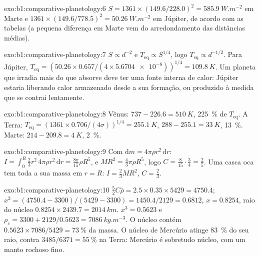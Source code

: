 \begin{solution}{exo:b1:comparative-planetology:6}
$S = 1361\times(149.6/228.0)^2 = \qty{585.9}{W.m^{-2}}$ em Marte e
$1361\times(149.6/778.5)^2 = \qty{50.26}{W.m^{-2}}$ em Júpiter, de acordo
com as tabelas (a pequena diferença em Marte vem do arredondamento das
distâncias médias).
\end{solution}

\begin{solution}{exo:b1:comparative-planetology:7}
$S \propto d^{-2}$ e $T_\mathrm{eq} \propto S^{1/4}$, logo $T_\mathrm{eq}
\propto d^{-1/2}$. Para Júpiter, $T_\mathrm{eq} = (50.26\times0.657/(4\times
\num{5.6704e-8}))^{1/4} = \qty{109.8}{K}$. Um planeta que irradia mais do que
absorve deve ter uma fonte interna de calor: Júpiter estaria liberando calor
armazenado desde a sua formação, ou produzido à medida que se contrai lentamente.
\end{solution}

\begin{solution}{exo:b1:comparative-planetology:8}
Vênus: $737 - 226.6 = \qty{510}{K}$, \qty{225}{\percent} de $T_\mathrm{eq}$.
A Terra: $T_\mathrm{eq} = (1361\times0.706/(4\sigma))^{1/4} = \qty{255.1}{K}$,
$288 - 255.1 = \qty{33}{K}$, \qty{13}{\percent}. Marte: $214 - 209.8 =
\qty{4}{K}$, \qty{2}{\percent}.
\end{solution}

\begin{solution}{exo:b1:comparative-planetology:9}
Com $\mathrm dm = 4\pi\rho r^2\,\mathrm dr$: $I = \int_0^R\tfrac23r^2\,4\pi
\rho r^2\,\mathrm dr = \tfrac{8\pi}{15}\rho R^5$, e $MR^2 = \tfrac43\pi\rho
R^5$, logo $C = \tfrac{8}{15}\cdot\tfrac34 = \tfrac25$. Uma casca oca tem toda a
sua massa em $r = R$: $I = \tfrac23MR^2$, $C = \tfrac23$.
\end{solution}

\begin{solution}{exo:b1:comparative-planetology:10}
$\tfrac52C\bar\rho = 2.5\times0.35\times5429 = 4750.4$;
$x^2 = (4750.4 - 3300)/(5429 - 3300) = 1450.4/2129 = 0.6812$, $x = 0.8254$,
raio do núcleo $0.8254\times2439.7 = \qty{2014}{km}$. $x^3 = 0.5623$ e
$\rho_c = 3300 + 2129/0.5623 = \qty{7086}{kg.m^{-3}}$. O núcleo contém
$0.5623\times7086/5429 = \qty{73}{\percent}$ da massa. O núcleo de Mercúrio
atinge \qty{83}{\percent} do seu raio, contra $3485/6371 =
\qty{55}{\percent}$ na Terra: Mercúrio é sobretudo núcleo, com um manto rochoso fino.
\end{solution}

